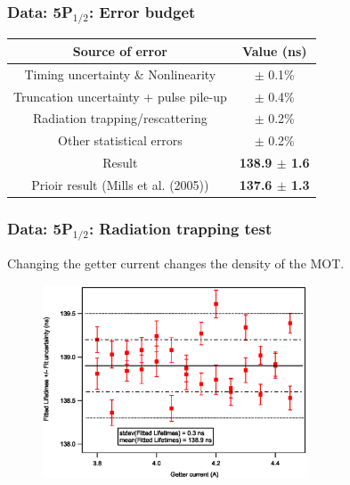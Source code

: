 \documentclass{beamer}
\theoremstyle{definition}
\begin{document}
\begin{frame}
\end{frame}







\begin{frame}
\frametitle{Data: 5P$_{\text{1/2}}$: Error budget}


\begin{table}
	\begin{center}
		\begin{tabular}{|c|c|}
			\hline
			Source of error & Value (ns)\\ \hline
			Timing uncertainty \& Nonlinearity & $\pm$ 0.1\% \\ 
			Truncation uncertainty + pulse pile-up & $\pm$ 0.4\%\\
			Radiation trapping/rescattering & $\pm$ 0.2\% \\
			Other statistical errors &   $\pm$ 0.2\%  \\
			\hline
			Result & \textbf{138.9 $\pm$ 1.6}  \\
			\hline
			Prioir result (Mills et al. (2005)) & \textbf{137.6 $\pm$ 1.3}  \\
			\hline
		\end{tabular}
	\end{center}
\end{table}

\end{frame}



\begin{frame}
\frametitle{Data: 5P$_{\text{1/2}}$: Radiation trapping test}



Changing the getter current changes the density of the MOT.


\begin{figure}[!htb]
	\centering
	\includegraphics[width=0.7\textwidth]{getter_currents.eps}
\end{figure}



\end{frame}
\end{document}
